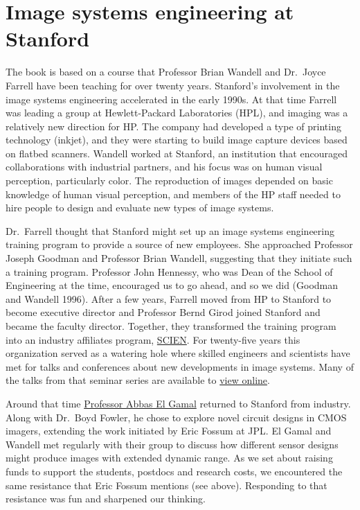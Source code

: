 \documentclass[
  letterpaper,
]{book}
\begin{document}
\section{Image systems engineering at
Stanford}\label{image-systems-engineering-at-stanford}

The book is based on a course that Professor Brian Wandell and Dr.~Joyce
Farrell have been teaching for over twenty years. Stanford's involvement
in the image systems engineering accelerated in the early 1990s. At that
time Farrell was leading a group at Hewlett-Packard Laboratories (HPL),
and imaging was a relatively new direction for HP. The company had
developed a type of printing technology (inkjet), and they were starting
to build image capture devices based on flatbed scanners. Wandell worked
at Stanford, an institution that encouraged collaborations with
industrial partners, and his focus was on human visual perception,
particularly color. The reproduction of images depended on basic
knowledge of human visual perception, and members of the HP staff needed
to hire people to design and evaluate new types of image systems.

Dr.~Farrell thought that Stanford might set up an image systems
engineering training program to provide a source of new employees. She
approached Professor Joseph Goodman and Professor Brian Wandell,
suggesting that they initiate such a training program. Professor John
Hennessy, who was Dean of the School of Engineering at the time,
encouraged us to go ahead, and so we did (Goodman and Wandell 1996).
After a few years, Farrell moved from HP to Stanford to become executive
director and Professor Bernd Girod joined Stanford and became the
faculty director. Together, they transformed the training program into
an industry affiliates program,
\href{https://scien.stanford.edu/}{SCIEN}. For twenty-five years this
organization served as a watering hole where skilled engineers and
scientists have met for talks and conferences about new developments in
image systems. Many of the talks from that seminar series are available
to
\href{https://scien.stanford.edu/index.php/events/scien-seminars/}{view
online}.

Around that time
\href{https://profiles.stanford.edu/abbas-el-gamal}{Professor Abbas El
Gamal} returned to Stanford from industry. Along with Dr.~Boyd Fowler,
he chose to explore novel circuit designs in CMOS imagers, extending the
work initiated by Eric Fossum at JPL. El Gamal and Wandell met regularly
with their group to discuss how different sensor designs might produce
images with extended dynamic range. As we set about raising funds to
support the students, postdocs and research costs, we encountered the
same resistance that Eric Fossum mentions (see above). Responding to
that resistance was fun and sharpened our thinking.
\end{document}
